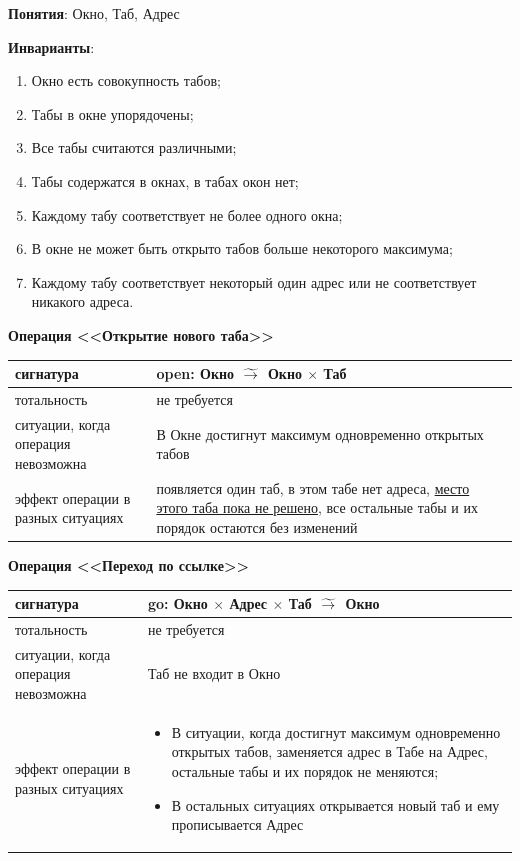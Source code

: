 \documentclass[14pt, twoside]{extreport}
\begin{document}
{\sf
\textbf{Понятия}: Окно, Таб, Адрес

\textbf{Инварианты}:
\begin{enumerate}
  \item Окно есть совокупность табов;
  \item Табы в окне упорядочены;
  \item Все табы считаются различными;
  \item Табы содержатся в окнах, в табах окон нет;
  \item Каждому табу соответствует не более одного окна;
  \item В окне не может быть открыто табов больше некоторого максимума;
  \item Каждому табу соответствует некоторый один адрес или не соответствует никакого адреса.
\end{enumerate}

\textbf{Операция <<Открытие нового таба>>}

\begin{tabular}{|p{}|p{}|}
  \hline
  сигнатура & open: Окно $\;\widetilde{\rightarrow}\;$ Окно $\times$ Таб \\ \hline
  тотальность & не требуется \\ \hline
  ситуации, когда операция невозможна & В Окне достигнут максимум одновременно открытых табов \\ \hline
  эффект операции в разных ситуациях & появляется один таб, в этом табе нет адреса, \underline{место этого таба пока не решено}, все остальные табы и их порядок остаются без изменений \\ \hline
\end{tabular}

\textbf{Операция <<Переход по ссылке>>}

\begin{tabular}{|p{}|p{}|}
  \hline
  сигнатура & go: Окно $\times$ Адрес $\times$ Таб $\;\widetilde{\rightarrow}\;$ Окно \\ \hline
  тотальность & не требуется \\ \hline
  ситуации, когда операция невозможна & Таб не входит в Окно \\ \hline
  эффект операции в разных ситуациях & \begin{itemize}\item В ситуации, когда достигнут максимум одновременно открытых табов, заменяется адрес в Табе на Адрес, остальные табы и их порядок не меняются; \item В остальных ситуациях открывается новый таб и ему прописывается Адрес\end{itemize} \\ \hline
\end{tabular}

}
\end{document}
